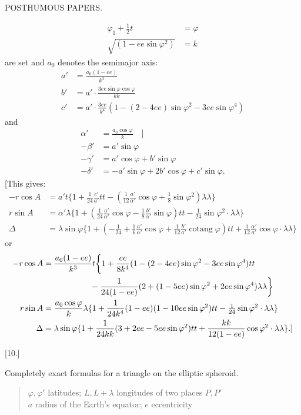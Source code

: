 \clearpage
{}\hfill POSTHUMOUS PAPERS.\hfill\mbox{}\par
\[
\begin{aligned}
\varphi_1+\tfrac12t&=\varphi\\
\sqrt{(1-ee\sin\varphi^2)}&=k
\end{aligned}
\]
are set and $a_0$ denotes the semimajor axis:
\[
\begin{aligned}
a'&=\frac{a_0(1-ee)}{k^3}\\
b'&=a'\cdot\frac{3ee\sin\varphi\cos\varphi}{kk}\\
c'&=a'\cdot\frac{3ee}{k^4}(1-(2-4ee)\sin\varphi^2-3ee\sin\varphi^4)
\end{aligned}
\]
and
\[
\begin{aligned}
\alpha'&=\frac{a_0\cos\varphi}{k}\quad\bigg]\\
-\beta'&=a'\sin\varphi\\
-\gamma'&=a'\cos\varphi+b'\sin\varphi\\
-\delta'&=-a'\sin\varphi+2b'\cos\varphi+c'\sin\varphi.
\end{aligned}
\]
[This gives:
\[
\begin{aligned}
-r\cos A&=a't\{1+\tfrac1{24}\tfrac{c'}{a'}tt-(\tfrac1{12}\tfrac{a'}{\alpha'}\cos\varphi+\tfrac18\sin\varphi^2)\lambda\lambda\}\\
r\sin A&=\alpha'\lambda\{1+(\tfrac1{24}\tfrac{a'}{\alpha'}\cos\varphi-\tfrac18\tfrac{b'}{\alpha'}\sin\varphi)tt-\tfrac1{24}\sin\varphi^2\cdot\lambda\lambda\}\\
\Delta&=\lambda\sin\varphi\{1+(-\tfrac1{24}+\tfrac16\tfrac{a'}{\alpha'}\cos\varphi+\tfrac1{12}\tfrac{b'}{a'}\operatorname{cotang}\varphi)tt+\tfrac1{12}\tfrac{\alpha'}{a'}\cos\varphi\cdot\lambda\lambda\}
\end{aligned}
\]
or
\[
\begin{aligned}
-r\cos A&=\frac{a_0(1-ee)}{k^3}t\bigg\{1+\frac{ee}{8k^4}(1-(2-4ee)\sin\varphi^2-3ee\sin\varphi^4)tt\\
&\hspace{20mm}-\frac{1}{24(1-ee)}(2+(1-5ee)\sin\varphi^2+2ee\sin\varphi^4)\lambda\lambda\bigg\}\\
r\sin A&=\frac{a_0\cos\varphi}{k}\lambda\{1+\frac{1}{24k^4}(1-ee)(1-10ee\sin\varphi^2)tt-\tfrac1{24}\sin\varphi^2\cdot\lambda\lambda\}\\
\Delta&=\lambda\sin\varphi\{1+\frac{1}{24kk}(3+2ee-5ee\sin\varphi^2)tt+\frac{kk}{12(1-ee)}\cos\varphi^2\cdot\lambda\lambda\}.]
\end{aligned}
\]
\begin{center}[10.]\end{center}
Completely exact formulas for a triangle on the elliptic spheroid.
\begin{quote}
$\varphi,\varphi'$ latitudes; $L,L+\lambda$ longitudes of two places $P,P'$\\
$a$ radius of the Earth's equator; $e$ eccentricity
\end{quote}


